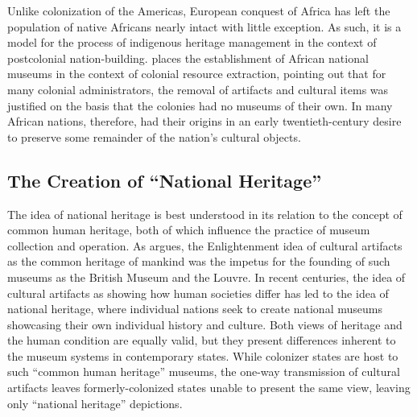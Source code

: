 \documentclass{../../../coursework}
\begin{document}
Unlike colonization of the Americas, European conquest of Africa has left the
population of native Africans nearly intact with little exception. As such, it
is a model for the process of indigenous heritage management in the context of
postcolonial nation-building. \textcite{Shy09} places the establishment of
African national museums in the context of colonial resource extraction,
pointing out that for many colonial administrators, the removal of artifacts
and cultural items was justified on the basis that the colonies had no museums
of their own. In many African nations, therefore, had their origins in an
early twentieth-century desire to preserve some remainder of the nation's
cultural objects.

\subsection{The Creation of ``National Heritage''}

The idea of national heritage is best understood in its relation to the
concept of common human heritage, both of which influence the practice of
museum collection and operation. As \textcite{Tur09} argues, the Enlightenment
idea of cultural artifacts as the common heritage of mankind was the impetus
for the founding of such museums as the British Museum  and the Louvre. In
recent centuries, the idea of cultural artifacts as showing how human
societies differ has led to the idea of national heritage, where individual
nations seek to create national museums showcasing their own individual
history and culture. Both views of heritage and the human condition are
equally valid, but they present differences inherent to the museum systems in
contemporary states. While colonizer states are host to such ``common human
heritage'' museums, the one-way transmission of cultural artifacts
\parencite{Kup14} leaves formerly-colonized states unable to present the same
view, leaving only ``national heritage'' depictions.
\end{document}
